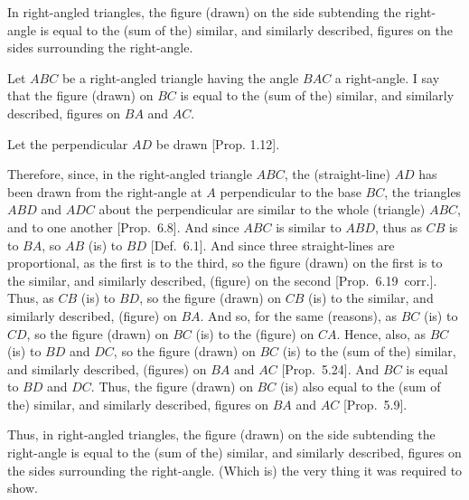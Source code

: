 \begin{Parallel}{}{}
{In right-angled triangles, the figure (drawn)
on the side subtending the right-angle is equal to the (sum of the) similar, and similarly
described, figures on the sides surrounding the right-angle.

\epsfysize=2in
\centerline{}

Let $ABC$ be a right-angled triangle having the angle $BAC$ a right-angle. I say
that the figure (drawn) on $BC$ is equal to the (sum of the) similar,
and similarly described, figures on $BA$ and $AC$.

Let the perpendicular $AD$ be drawn  [Prop. 1.12].

Therefore, since, in the right-angled triangle  $ABC$, the (straight-line) $AD$ has been drawn from the right-angle
at $A$ perpendicular to the base $BC$, the triangles $ABD$
and $ADC$ about the perpendicular are similar to the whole (triangle) $ABC$,
and to one another  [Prop.~6.8].
And since $ABC$ is similar to $ABD$, thus as $CB$ is to $BA$, so $AB$ (is) to
$BD$ [Def.~6.1]. And since three straight-lines
are proportional, as the first is to the third, so the figure (drawn) on the
first is to the similar, and similarly described, (figure) on the second 
[Prop.~6.19~corr.]. Thus, as $CB$ (is) to
$BD$, so the figure (drawn) on $CB$ (is) to the similar, and similarly
described, (figure) on $BA$. And so, for the same (reasons), as $BC$ (is) to
$CD$, so the figure  (drawn) on $BC$ (is) to the (figure) on $CA$. Hence,
also, as $BC$ (is) to $BD$ and $DC$, so the figure (drawn) on $BC$ (is) to
the (sum of the) similar, and similarly described, (figures) on $BA$ and $AC$ [Prop.~5.24].
And $BC$ is equal to $BD$ and $DC$. Thus, the figure (drawn) on $BC$
(is) also equal to the (sum of the) similar, and similarly described, figures
on $BA$ and $AC$ [Prop.~5.9].

Thus, in right-angled triangles, the figure (drawn)
on the side subtending the right-angle is equal to the (sum of the) similar, and similarly
described, figures on the sides surrounding the right-angle. (Which is)
the very thing it was required to show.\\~\\}
\end{Parallel}

